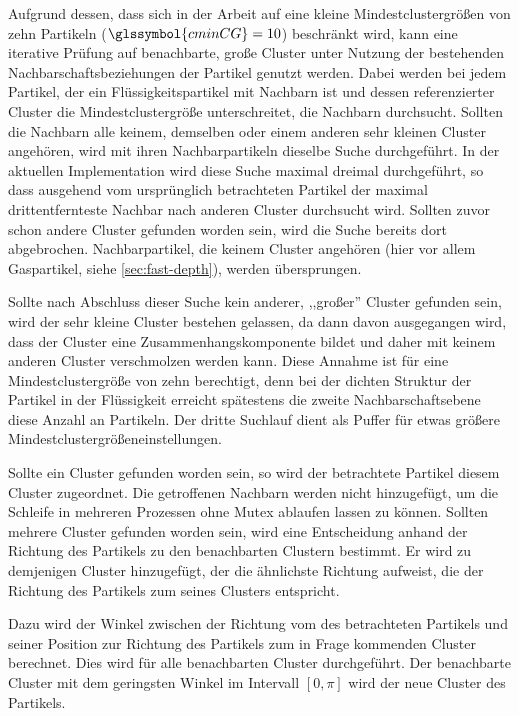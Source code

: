 Aufgrund dessen, dass sich in der Arbeit auf eine kleine Mindestclustergrößen von zehn Partikeln ($\glssymbol{cminCG} = 10$) beschränkt wird, kann eine iterative Prüfung auf benachbarte, große Cluster unter Nutzung der bestehenden Nachbarschaftsbeziehungen der Partikel genutzt werden. Dabei werden bei jedem Partikel, der ein Flüssigkeitspartikel mit Nachbarn ist und dessen referenzierter Cluster die Mindestclustergröße unterschreitet, die Nachbarn durchsucht. Sollten die Nachbarn alle keinem, demselben oder einem anderen sehr kleinen Cluster angehören, wird mit ihren Nachbarpartikeln dieselbe Suche durchgeführt. In der aktuellen Implementation wird diese Suche maximal dreimal durchgeführt, so dass ausgehend vom ursprünglich betrachteten Partikel der maximal drittentfernteste Nachbar nach anderen Cluster durchsucht wird. Sollten zuvor schon andere Cluster gefunden worden sein, wird die Suche bereits dort abgebrochen. Nachbarpartikel, die keinem Cluster angehören (hier vor allem Gaspartikel, siehe \autoref{sec:fast-depth}), werden übersprungen.

Sollte nach Abschluss dieser Suche kein anderer, ,,großer'' Cluster gefunden sein, wird der sehr kleine Cluster bestehen gelassen, da dann davon ausgegangen wird, dass der Cluster eine Zusammenhangskomponente bildet und daher mit keinem anderen Cluster verschmolzen werden kann. Diese Annahme ist für eine Mindestclustergröße von zehn berechtigt, denn bei der dichten Struktur der Partikel in der Flüssigkeit erreicht spätestens die zweite Nachbarschaftsebene diese Anzahl an Partikeln. Der dritte Suchlauf dient als Puffer für etwas größere Mindestclustergrößeneinstellungen.

Sollte ein Cluster gefunden worden sein, so wird der betrachtete Partikel diesem Cluster zugeordnet. Die getroffenen Nachbarn werden nicht hinzugefügt, um die Schleife in mehreren Prozessen ohne Mutex ablaufen lassen zu können. Sollten mehrere Cluster gefunden worden sein, wird eine Entscheidung anhand der Richtung des Partikels zu den benachbarten Clustern bestimmt. Er wird zu demjenigen Cluster hinzugefügt, der die ähnlichste Richtung aufweist, die der Richtung des Partikels zum  seines Clusters entspricht.

Dazu wird der Winkel zwischen der Richtung vom  des betrachteten Partikels und seiner Position zur Richtung des Partikels zum in Frage kommenden Cluster berechnet. Dies wird für alle benachbarten Cluster durchgeführt. Der benachbarte Cluster mit dem geringsten Winkel im Intervall $[0, \pi]$ wird der neue Cluster des Partikels.


